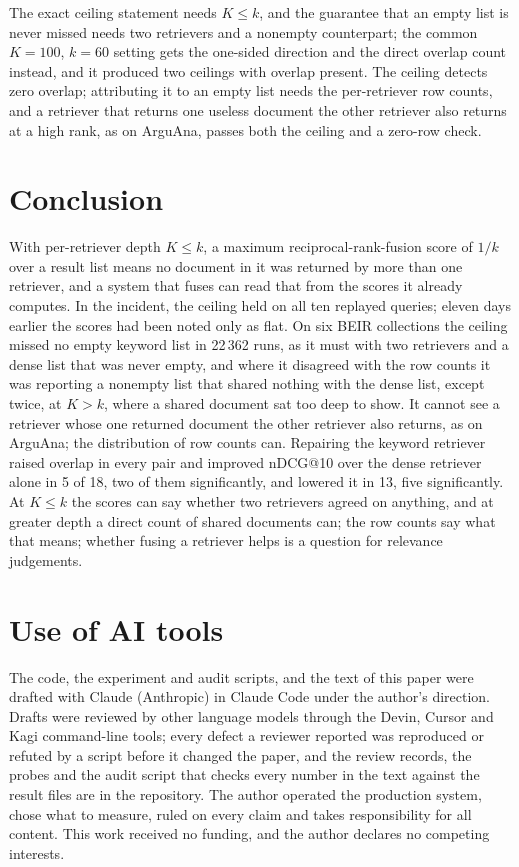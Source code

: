 \documentclass[11pt]{article}
\begin{document}
The exact ceiling statement needs $K \le k$, and the guarantee that an empty list is never missed needs two retrievers and a nonempty counterpart; the common $K = 100$, $k = 60$ setting gets the one-sided direction and the direct overlap count instead, and it produced two ceilings with overlap present. The ceiling detects zero overlap; attributing it to an empty list needs the per-retriever row counts, and a retriever that returns one useless document the other retriever also returns at a high rank, as on ArguAna, passes both the ceiling and a zero-row check.

\section{Conclusion}
\label{sec:conclusion}

With per-retriever depth $K \le k$, a maximum reciprocal-rank-fusion score of $1/k$ over a result list means no document in it was returned by more than one retriever, and a system that fuses can read that from the scores it already computes. In the incident, the ceiling held on all ten replayed queries; eleven days earlier the scores had been noted only as flat. On six BEIR collections the ceiling missed no empty keyword list in 22\,362 runs, as it must with two retrievers and a dense list that was never empty, and where it disagreed with the row counts it was reporting a nonempty list that shared nothing with the dense list, except twice, at $K > k$, where a shared document sat too deep to show. It cannot see a retriever whose one returned document the other retriever also returns, as on ArguAna; the distribution of row counts can. Repairing the keyword retriever raised overlap in every pair and improved nDCG@10 over the dense retriever alone in 5 of 18, two of them significantly, and lowered it in 13, five significantly. At $K \le k$ the scores can say whether two retrievers agreed on anything, and at greater depth a direct count of shared documents can; the row counts say what that means; whether fusing a retriever helps is a question for relevance judgements.

\section*{Use of AI tools}

The code, the experiment and audit scripts, and the text of this paper were drafted with Claude (Anthropic) in Claude Code under the author's direction. Drafts were reviewed by other language models through the Devin, Cursor and Kagi command-line tools; every defect a reviewer reported was reproduced or refuted by a script before it changed the paper, and the review records, the probes and the audit script that checks every number in the text against the result files are in the repository. The author operated the production system, chose what to measure, ruled on every claim and takes responsibility for all content. This work received no funding, and the author declares no competing interests.
\end{document}
